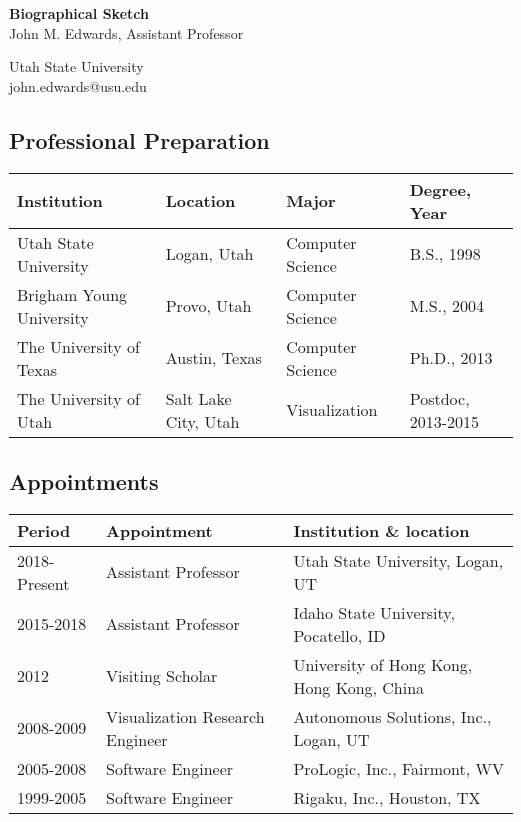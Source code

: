 \documentclass[svgnames,12pt]{article}
\begin{document}
\begin{center}
\begin{large}\textbf{Biographical Sketch} \\
John M. Edwards, Assistant Professor \\ \end{large}
Utah State University \\
john.edwards@usu.edu \\
\end{center}

\subsection*{Professional Preparation}
\begin{tabular}{llll}
Institution & Location & Major & Degree, Year \\
\midrule
Utah State University & Logan, Utah & Computer Science & B.S., 1998 \\
Brigham Young University & Provo, Utah & Computer Science & M.S., 2004 \\
The University of Texas & Austin, Texas & Computer Science & Ph.D., 2013 \\
The University of Utah & Salt Lake City, Utah & Visualization & Postdoc, 2013-2015
\end{tabular}

\subsection*{Appointments}
\begin{tabular}{lll}
Period & Appointment & Institution \& location \\
\midrule
2018-Present & Assistant Professor & Utah State University, Logan, UT \\
2015-2018 & Assistant Professor & Idaho State University, Pocatello, ID \\
2012 & Visiting Scholar & University of Hong Kong, Hong Kong, China \\
2008-2009 & Visualization Research Engineer & Autonomous Solutions, Inc., Logan, UT \\
2005-2008 & Software Engineer & ProLogic, Inc., Fairmont, WV \\
1999-2005 & Software Engineer & Rigaku, Inc., Houston, TX
\end{tabular}
\end{document}

